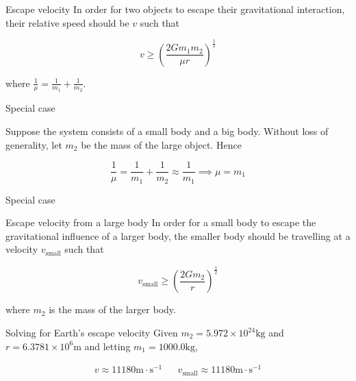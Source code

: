 \begin{frame}{\subsecname}

\begin{block}{Escape velocity}
In order for two objects to escape their gravitational interaction, their relative speed should be \(v\) such that

\begin{equation}
v \geq \left(\frac{2Gm_1m_2}{\mu r}\right)^{\frac{1}{2}}
\end{equation}

where \(\frac{1}{\mu} = \frac{1}{m_1} + \frac{1}{m_2}\).

\end{block}

\end{frame}

\begin{frame}{Special case}

Suppose the system consists of a small body and a big body. Without loss of generality, let \(m_2\) be the mass of the large object. Hence

\begin{equation}
\frac{1}{\mu} = \frac{1}{m_1} + \frac{1}{m_2} \approx \frac{1}{m_1} \implies \mu = m_1
\end{equation}

\end{frame}

\begin{frame}{Special case}

\begin{block}{Escape velocity from a large body}
In order for a small body to escape the gravitational influence of a larger body, the smaller body should be travelling at a velocity \(v_\text{small}\) such that 

\begin{equation}
v_\text{small} \geq \left(\frac{2Gm_2}{r}\right)^{\frac{1}{2}}
\end{equation}

where \(m_2\) is the mass of the larger body.

\end{block}

\end{frame}


\begin{frame}{Solving for Earth's escape velocity}
Given \(m_2 = 5.972 \times 10^{24} \text{kg}\) and \(r = 6.3781 \times 10^6 \text{m}\) and letting \(m_1 = 1000.0 \text{kg}\),

\begin{align}
v \approx 11180 \text{m} \cdot \text{s}^{-1} && v_\text{small} \approx 11180 \text{m} \cdot \text{s}^{-1}
\end{align}
\end{frame}

